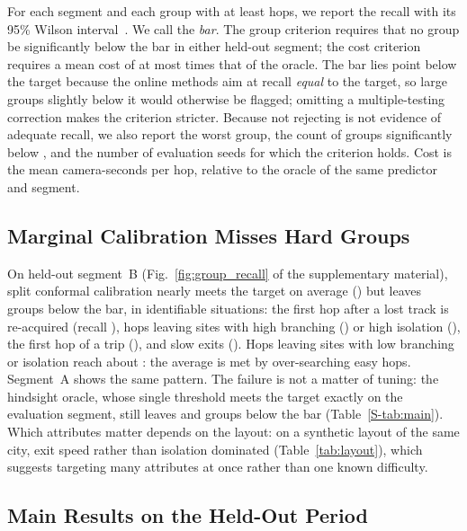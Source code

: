 For each segment and each group with at least \minGroupHops{} hops, we report the
recall with its 95\% Wilson interval~\cite{wilson1927}. We call \groupBar{} the
\emph{bar}. The group criterion requires that no group be significantly below the
bar in either held-out segment; the cost criterion requires a mean cost of at most
\costFactor{} times that of the oracle. The bar lies \barGapPointsWord{} point below the target
because the online methods aim at recall \emph{equal} to the target, so large
groups slightly below it would otherwise be flagged; omitting a multiple-testing
correction makes the criterion stricter. Because not rejecting is not evidence of
adequate recall, we also report the worst group, the count of groups significantly
below \targetRecall, and the number of evaluation seeds for which the criterion
holds. Cost is the mean camera-seconds per hop, relative to the oracle of the same
predictor and segment.


\subsection{Marginal Calibration Misses Hard Groups}
\label{app:earlier:problem}

On held-out segment~B (Fig.~\ref{fig:group_recall} of the supplementary material), split conformal calibration
nearly meets the target on average (\heldStaticRecallB) but leaves
\heldStaticBelowBarB{} groups below the bar, in identifiable situations: the first
hop after a lost track is re-acquired (recall \heldStaticWorstB), hops leaving
sites with high branching (\heldStaticBranchHighRecallB) or high isolation
(\heldStaticIsoHighRecallB), the first hop of a trip
(\heldStaticInitiatedRecallB), and slow exits (\heldStaticSlowRecallB). Hops
leaving sites with low branching or isolation reach about
\heldStaticEasyRecallApproxB: the average is met by over-searching easy hops.
Segment~A shows the same pattern. The failure is not a matter of tuning: the
hindsight oracle, whose single threshold meets the target exactly on the
evaluation segment, still leaves \heldOracleBelowBarA{} and \heldOracleBelowBarB{}
groups below the bar (Table~\ref{S-tab:main}). Which attributes matter depends on
the layout: on a synthetic layout of the same city, exit speed rather than
isolation dominated (Table~\ref{tab:layout}), which suggests targeting many
attributes at once rather than one known difficulty.

\subsection{Main Results on the Held-Out Period}
\label{app:earlier:main}

